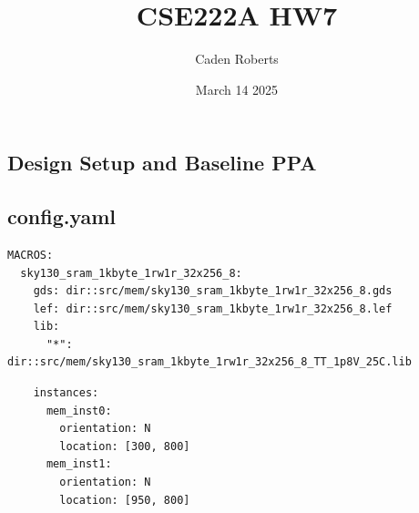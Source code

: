 \documentclass{article}
\title{CSE222A HW7}
\author{Caden Roberts}
\date{March 14 2025}
\begin{document}
\maketitle
\begin{flushleft}
\section{Design Setup and Baseline PPA}
\subsection{\bf{config.yaml}}
\noindent\makebox[\linewidth]{\rule{\paperwidth}{0.4pt}}
\begin{lstlisting}
MACROS: 
  sky130_sram_1kbyte_1rw1r_32x256_8:
    gds: dir::src/mem/sky130_sram_1kbyte_1rw1r_32x256_8.gds
    lef: dir::src/mem/sky130_sram_1kbyte_1rw1r_32x256_8.lef 
    lib: 
      "*": dir::src/mem/sky130_sram_1kbyte_1rw1r_32x256_8_TT_1p8V_25C.lib
\end{lstlisting}
\bf{\begin{lstlisting}
    instances:
      mem_inst0:
        orientation: N
        location: [300, 800]
      mem_inst1:
        orientation: N
        location: [950, 800]


\end{lstlisting}}
\end{flushleft}
\end{document}
